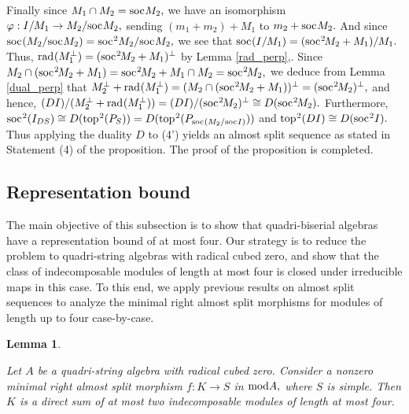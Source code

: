 \documentclass[10pt]{amsart}
\newtheorem{Lemma}[Theo]{Lemma}
\theoremstyle{definition}
\newcommand{\mmod}{{\rm mod}}
\newcommand{\rad}{{\rm rad}\hspace{.5pt}}
\newcommand{\soc}{{\rm soc}\hspace{.5pt}}
\newcommand{\ntop}{{\rm top}\hspace{.5pt}}
\newcommand{\vp}{\vspace{.5pt}}
\begin{document}
Finally since $M_1\cap M_2=\soc M_2,$ we have an isomorphism $\varphi: I/M_1\to M_2/\soc M_2,$ sending $(m_1+m_2)+M_1$ to $m_2+\soc M_2.$ And since $\soc(M_2/\soc M_2)=\soc^2M_2/\soc M_2,$ we see that \vp $\soc(I/M_1)=(\soc^2\hspace{-1.2pt}M_2+M_1)/M_1.$ 
Thus, $\rad(M_1^\perp)=(\soc^2\hspace{-1.2pt}M_2+M_1)^\perp$ by Lemma \ref{rad_perp},. Since $M_2 \cap (\soc^2\hspace{-1.2pt}M_2+M_1)=\soc^2\hspace{-1pt}M_2+M_1\cap M_2=\soc^2\hspace{-1.2pt}M_2,$ we deduce from Lemma \ref{dual_perp} \vp that $M_2^\perp+\rad(M_1^\perp) 
= (M_2 \cap (\soc^2\hspace{-1.2pt}M_2+M_1))^\perp = (\soc^2\hspace{-1.2pt}M_2)^\perp,$ 
and hence, $(DI)/(M_2^\perp+\rad(M_1^\perp)) = (DI)/(\soc^2\hspace{-1.2pt}M_2)^\perp \cong D(\soc^2\hspace{-1.2pt}M_2).$ \vp Furthermore, $\soc^2(I_{DS}) \cong D(\ntop^2(P_S))=D(\ntop^2(P_{\soc(M_2/\soc I)}))$ and $\ntop^2(DI) \cong D(\soc^2I).$ Thus applying the duality $D$ to (4') yields an almost split sequence as stated in Statement (4) of the proposition. The proof of the proposition is completed.

\subsection{\sc Representation bound} The main objective of this subsection is to show that quadri-biserial algebras have a representation bound of at most four. Our strategy is to reduce the problem to quadri-string algebras with radical cubed zero, and show that the class of indecomposable modules of length at most four is closed under irreducible maps in this case. To this end, we apply previous results on almost split sequences to analyze the minimal right almost split morphisms for modules of length up to four case-by-case.

\vspace{-1pt}

\begin{Lemma}\label{4sa_rasm_l1}

Let $A$ be a quadri-string algebra with radical cubed zero. Consider a nonzero minimal right almost split morphism $f: K\to S$ in $\mmod A,$ where $S$ is simple. Then $K$ is a direct sum of at most two indecomposable modules of length at most four.

\end{Lemma}
\end{document}
